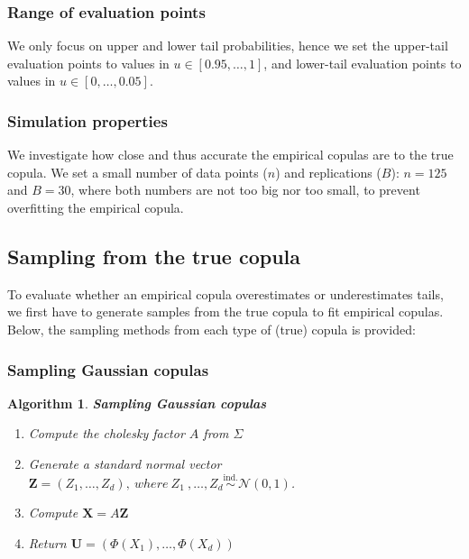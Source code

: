 \documentclass[12pt]{report}
\newtheorem{algorithmold}{Algorithm}[section]
\newcommand{\1}{\mathbf{1}}
\begin{document}
\begin{flushleft}
\subsubsection{Range of evaluation points}
We only focus on upper and lower tail probabilities, hence we set the upper-tail evaluation points to values in $u \in [ 0.95, \dots, 1 ]$, and lower-tail evaluation points to values in $u \in [ 0, \dots, 0.05 ]$.

\subsubsection{Simulation properties}
We investigate how close and thus accurate the empirical copulas are to the true copula. We set a small number of data points ($n$) and replications ($B$): $n = 125$ and $B = 30$, where both numbers are not too big nor too small, to prevent overfitting the empirical copula.
\vspace{0.5cm}
\subsection{Sampling from the true copula}
\vspace{0.5cm}
To evaluate whether an empirical copula overestimates or underestimates tails, we first have to generate samples from the true copula to fit empirical copulas. Below, the sampling methods from each type of (true) copula is provided:

\subsubsection{Sampling Gaussian copulas}
\begin{algorithmold}\label{GaussianCopulaResampling}
\textit{\normalfont\parencite{HofertBook}}\:
\textbf{Sampling Gaussian copulas}\\
\begin{enumerate}
\item Compute the cholesky factor $A$ from $\Sigma$
\item Generate a standard normal vector $\textbf{Z} = (Z_{1}, \dots, Z_{d}),\: where \: Z_{1} \:, \dots, Z_{d} \overset{\text{ind.}}{\sim} \mathcal{N}(0,1)$.
\item Compute $\textbf{X} = A\textbf{Z}$
\item Return $\textbf{U} = (\Phi(X_{1}), \dots, \Phi(X_{d}))$
\end{enumerate}
\end{algorithmold}

\end{flushleft}
\end{document}
